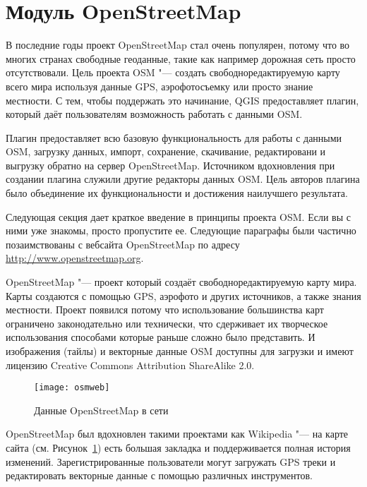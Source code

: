 
\section{Модуль OpenStreetMap}\label{plugins_osm}


В последние годы проект OpenStreetMap стал очень популярен, потому что
во многих странах свободные геоданные, такие как например дорожная сеть
просто отсутствовали. Цель проекта OSM "--- создать свободноредактируемую
карту всего мира используя данные GPS, аэрофотосъемку или просто знание
местности. С тем, чтобы поддержать это начинание, QGIS предоставляет
плагин, который даёт пользователям возможность работать с данными OSM.

Плагин предоставляет всю базовую функциональность для работы с данными
OSM, загрузку данных, импорт, сохранение, скачивание, редактировани и
выгрузку обратно на сервер OpenStreetMap. Источником вдохновления при
создании плагина служили другие редакторы данных OSM. Цель авторов
плагина было объединение их функциональности и достижения наилучшего
результата.

Следующая секция дает краткое введение в принципы проекта OSM. Если вы
с ними уже знакомы, просто пропустите ее. Следующие параграфы были
частично позаимствованы с вебсайта OpenStreetMap по адресу
\url{http://www.openstreetmap.org}.


OpenStreetMap "--- проект который создаёт свободноредактируемую карту
мира. Карты создаются с помощью GPS, аэрофото и других источников, а
также знания местности. Проект появился потому что использование
большинства карт ограничено законодательно или технически, что
сдерживает их творческое использования способами которые раньше сложно
было представить. И изображения (тайлы) и векторные данные OSM доступны
для загрузки и имеют лицензию Creative Commons Attribution ShareAlike 2.0.

\begin{figure}[ht]
   \centering
   \texttt{[image: osmweb]}
   \caption{Данные OpenStreetMap в сети \nixcaption}\label{fig:osmweb}
\end{figure}

OpenStreetMap был вдохновлен такими проектами как Wikipedia "--- на карте
сайта (см. Рисунок~\ref{fig:osmweb}) есть большая закладка
 и поддерживается полная история изменений.
Зарегистрированные пользователи могут загружать GPS треки и редактировать
векторные данные с помощью различных инструментов.

